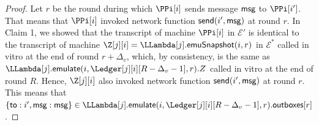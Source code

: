 \begin{proof}





  Let $r$ be the round during which $\PPi[i]$ sends message $\textsf{msg}$ to $\PPi[i']$.
  That means that $\PPi[i]$ invoked network function $\textsf{send}(i', \textsf{msg})$ at round $r$.
  In Claim 1, we showed that the transcript of machine $\PPi[i]$ in $\mathcal{E}'$
  is identical to the transcript of machine $\Z[j][i] = \LLambda[j].\emulationSnapshot(i,r)$ in $\mathcal{E}^*$
  called in vitro at the end of round $r + \Delta_v$, which, by consistency, is the same as
  $\LLambda[j].\emulate(i, \Ledger[j][i][R - \Delta_v - 1], r).Z$ called in vitro at the end of round $R$.
  Hence, $\Z[j][i]$ also invoked network function $\textsf{send}(i', \textsf{msg})$ at round $r$.
  This means that $\{\textsf{to}: i', \msg: \msg\} \in \LLambda[j].\emulate(i, \Ledger[j][i][R - \Delta_v - 1], r).\outboxes[r]$.


\end{proof}
